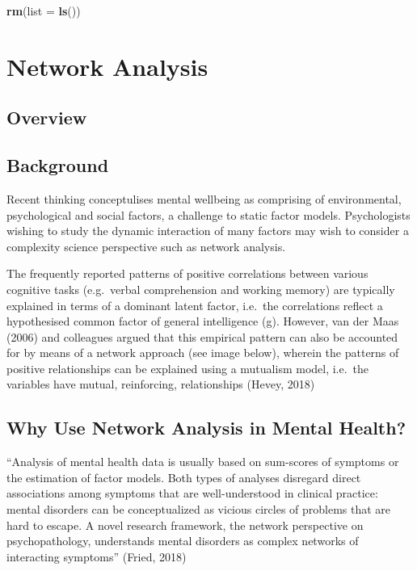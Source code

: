 \documentclass[]{book}
\newenvironment{Shaded}{\begin{snugshade}}{\end{snugshade}}
\newcommand{\DataTypeTok}[1]{\textcolor[rgb]{0.13,0.29,0.53}{#1}}
\newcommand{\KeywordTok}[1]{\textcolor[rgb]{0.13,0.29,0.53}{\textbf{#1}}}
\newcommand{\NormalTok}[1]{#1}
\begin{document}
\begin{Shaded}
\begin{Highlighting}[]
\KeywordTok{rm}\NormalTok{(}\DataTypeTok{list =} \KeywordTok{ls}\NormalTok{())}
\end{Highlighting}
\end{Shaded}

\hypertarget{network-analysis}{%
\chapter{Network Analysis}\label{network-analysis}}

\hypertarget{overview-3}{%
\section{Overview}\label{overview-3}}

\hypertarget{background}{%
\section{Background}\label{background}}

Recent thinking conceptulises mental wellbeing as comprising of environmental, psychological and social factors, a challenge to static factor models. Psychologists wishing to study the dynamic interaction of many factors may wish to consider a complexity science perspective such as network analysis.

The frequently reported patterns of positive correlations between various cognitive tasks (e.g.~verbal comprehension and working memory) are typically explained in terms of a dominant latent factor, i.e.~the correlations reflect a hypothesised common factor of general intelligence (g). However, van der Maas (2006) and colleagues argued that this empirical pattern can also be accounted for by means of a network approach (see image below), wherein the patterns of positive relationships can be explained using a mutualism model, i.e.~the variables have mutual, reinforcing, relationships (Hevey, 2018)

\hypertarget{why-use-network-analysis-in-mental-health}{%
\section{Why Use Network Analysis in Mental Health?}\label{why-use-network-analysis-in-mental-health}}

``Analysis of mental health data is usually based on sum-scores of symptoms or the estimation of factor models. Both types of analyses disregard direct associations among symptoms that are well-understood in clinical practice: mental disorders can be conceptualized as vicious circles of problems that are hard to escape. A novel research framework, the network perspective on psychopathology, understands mental disorders as complex networks of interacting symptoms'' (Fried, 2018)
\end{document}
